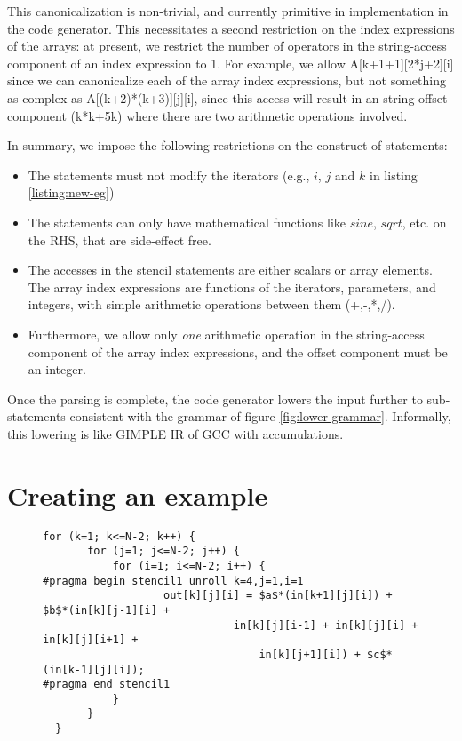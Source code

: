 This canonicalization is non-trivial, and currently primitive in implementation
in the code generator. This necessitates a second restriction on the index
expressions of the arrays: at present, we restrict the number of operators in
the string-access component of an index expression to 1. For example, we allow
A[k+1+1][2*j+2][i] since we can canonicalize each of the array index
expressions, but not something as complex as A[(k+2)*(k+3)][j][i], since this
access will result in an string-offset component (k*k+5k) where there are two
arithmetic operations involved.
 
In summary, we impose the following restrictions on the construct of statements:
\begin{itemize}
\item The statements must not modify the iterators (e.g., $i$, $j$ and $k$ in listing
\ref{listing:new-eg})
\item The statements can only have mathematical functions like $\mathit{sine}$,
$\mathit{sqrt}$, etc. on the RHS, that are side-effect free.  
\item The accesses in the stencil statements are either scalars or array
elements. The array index expressions are functions of the iterators,
parameters, and integers, with simple arithmetic operations between them
(+,-,*,/). 
\item Furthermore, we allow only \textit{one} arithmetic operation in the
string-access component of the array index expressions, and the offset
component must be an integer.
\end{itemize} 

Once the parsing is complete, the code
generator lowers the input further to sub-statements consistent with the
grammar of figure \ref{fig:lower-grammar}. Informally, this lowering is like
GIMPLE IR of GCC \cite{gcc} with accumulations. 


\section{Creating an example}
\begin{figure}[t!]
\vspace*{-1em}
\begin{lstlisting}[escapechar=@,caption={The input representation with pragmas},label={listing:new-eg}]
  for (k=1; k<=N-2; k++) {
       for (j=1; j<=N-2; j++) {
           for (i=1; i<=N-2; i++) {
#pragma begin stencil1 unroll k=4,j=1,i=1
                   out[k][j][i] = $a$*(in[k+1][j][i]) + $b$*(in[k][j-1][i] +
                              in[k][j][i-1] + in[k][j][i] + in[k][j][i+1] +
                                  in[k][j+1][i]) + $c$*(in[k-1][j][i]);
#pragma end stencil1
           }
       }
  }
\end{lstlisting}
\end{figure}

